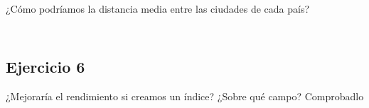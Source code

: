 ¿Cómo podríamos la distancia media entre las ciudades de cada país?

\begin{lstlisting}

\end{lstlisting}

\begin{lstlisting}

\end{lstlisting}

\subsection{Ejercicio 6}

¿Mejoraría el rendimiento si creamos un índice? ¿Sobre qué campo? Comprobadlo

\begin{lstlisting}

\end{lstlisting}

\begin{lstlisting}

\end{lstlisting}




